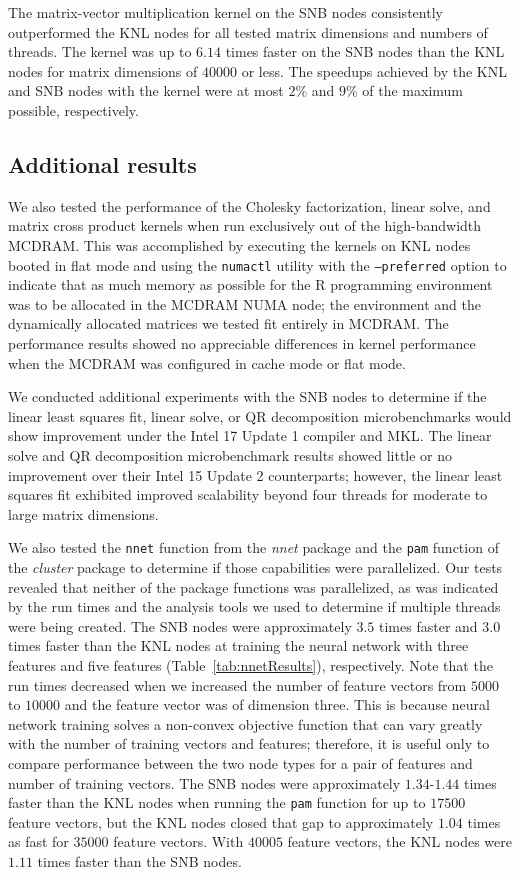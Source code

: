 The matrix-vector multiplication kernel on the SNB nodes consistently outperformed the KNL
nodes for all tested matrix dimensions and numbers of threads. The kernel was up to $6.14$
times faster on the SNB nodes than the KNL nodes for matrix dimensions of $40000$ or less.
The speedups achieved by the KNL and SNB nodes with the kernel were at most $2\%$ and
$9\%$ of the maximum possible, respectively.

\subsection{Additional results}

We also tested the performance of the Cholesky factorization, linear solve, and matrix
cross product kernels when run exclusively out of the high-bandwidth MCDRAM. This was
accomplished by executing the kernels on KNL nodes booted in flat mode and using the
\texttt{numactl} utility with the \texttt{--preferred} option to indicate that as much
memory as possible for the R programming environment was to be allocated in the MCDRAM
NUMA node; the environment and the dynamically allocated matrices we tested fit entirely
in MCDRAM. The performance results showed no appreciable differences in kernel performance
when the MCDRAM was configured in cache mode or flat mode.

We conducted additional experiments with the SNB nodes to determine if the linear least
squares fit, linear solve, or QR decomposition microbenchmarks would show improvement
under the Intel 17 Update 1 compiler and MKL. The linear solve and QR decomposition
microbenchmark results showed little or no improvement over their Intel 15 Update 2
counterparts; however, the linear least squares fit exhibited improved scalability beyond
four threads for moderate to large matrix dimensions.

We also tested the \texttt{nnet} function from the \textit{nnet} package and the
\texttt{pam} function of the \textit{cluster} package to determine if those capabilities
were parallelized. Our tests revealed that neither of the package functions was
parallelized, as was indicated by the run times and the analysis tools we used to
determine if multiple threads were being created. The SNB nodes were approximately $3.5$
times faster and $3.0$ times faster than the KNL nodes at training the neural network with
three features and five features (Table~\ref{tab:nnetResults}), respectively. Note that
the run times decreased when we increased the number of feature vectors from $5000$ to
$10000$ and the feature vector was of dimension three. This is because neural network
training solves a non-convex objective function that can vary greatly with the number of
training vectors and features; therefore, it is useful only to compare performance between
the two node types for a pair of features and number of training vectors. The SNB nodes
were approximately $1.34$-$1.44$ times faster than the KNL nodes when running the
\texttt{pam} function for up to $17500$ feature vectors, but the KNL nodes closed that gap
to approximately $1.04$ times as fast for $35000$ feature vectors. With $40005$ feature
vectors, the KNL nodes were $1.11$ times faster than the SNB nodes.

